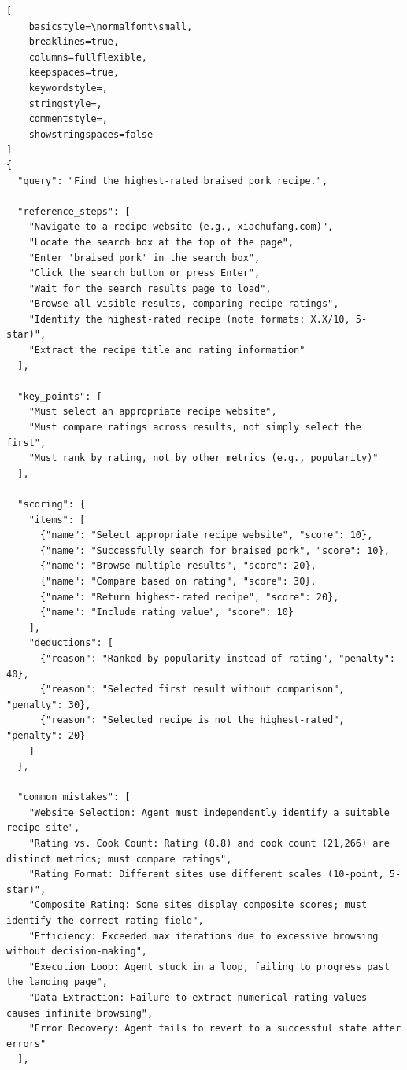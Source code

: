 \begin{tcolorbox}[
  title={Example rubric (merged $R_{\text{norm}} \cup R_{\text{emp}}$)},
  colback=white,
  colframe=tableblueTitle,
  colbacktitle=tableblueTitle,
  coltitle=white,
  fonttitle=\bfseries,
  breakable,
  enhanced,
  boxrule=1.2pt,
  arc=1.5mm
]

\begin{lstlisting}[
    basicstyle=\normalfont\small,
    breaklines=true,
    columns=fullflexible,
    keepspaces=true,
    keywordstyle=,
    stringstyle=,
    commentstyle=,
    showstringspaces=false
]
{
  "query": "Find the highest-rated braised pork recipe.",

  "reference_steps": [
    "Navigate to a recipe website (e.g., xiachufang.com)",
    "Locate the search box at the top of the page",
    "Enter 'braised pork' in the search box",
    "Click the search button or press Enter",
    "Wait for the search results page to load",
    "Browse all visible results, comparing recipe ratings",
    "Identify the highest-rated recipe (note formats: X.X/10, 5-star)",
    "Extract the recipe title and rating information"
  ],

  "key_points": [
    "Must select an appropriate recipe website",
    "Must compare ratings across results, not simply select the first",
    "Must rank by rating, not by other metrics (e.g., popularity)"
  ],

  "scoring": {
    "items": [
      {"name": "Select appropriate recipe website", "score": 10},
      {"name": "Successfully search for braised pork", "score": 10},
      {"name": "Browse multiple results", "score": 20},
      {"name": "Compare based on rating", "score": 30},
      {"name": "Return highest-rated recipe", "score": 20},
      {"name": "Include rating value", "score": 10}
    ],
    "deductions": [
      {"reason": "Ranked by popularity instead of rating", "penalty": 40},
      {"reason": "Selected first result without comparison", "penalty": 30},
      {"reason": "Selected recipe is not the highest-rated", "penalty": 20}
    ]
  },

  "common_mistakes": [
    "Website Selection: Agent must independently identify a suitable recipe site",
    "Rating vs. Cook Count: Rating (8.8) and cook count (21,266) are distinct metrics; must compare ratings",
    "Rating Format: Different sites use different scales (10-point, 5-star)",
    "Composite Rating: Some sites display composite scores; must identify the correct rating field",
    "Efficiency: Exceeded max iterations due to excessive browsing without decision-making",
    "Execution Loop: Agent stuck in a loop, failing to progress past the landing page",
    "Data Extraction: Failure to extract numerical rating values causes infinite browsing",
    "Error Recovery: Agent fails to revert to a successful state after errors"
  ],


\end{lstlisting}
\end{tcolorbox}
